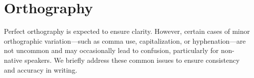 \chapter{Orthography}
\label{ch:orthography}

Perfect orthography is expected to ensure clarity. 
However, certain cases of minor orthographic variation---such as comma use, capitalization, or hyphenation---are not uncommon and may occasionally lead to confusion, particularly for non-native speakers.
We briefly address these common issues to ensure consistency and accuracy in writing.





